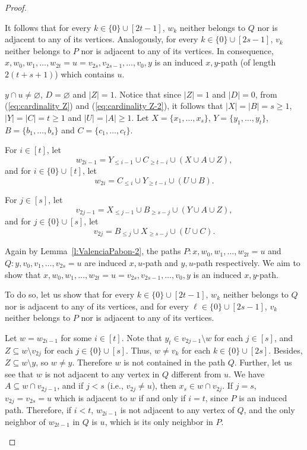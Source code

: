 \documentclass[a4paper,11pt]{article}
\renewcommand{\emptyset}{\varnothing}
\begin{document}
\begin{proof}
\begin{description}
        It follows that for every $k\in\{0\}\cup [2t-1]$, $w_k$ neither belongs to $Q$ nor is adjacent to any of its vertices. Analogously, for every $k\in\{0\}\cup [2s-1]$, $v_k$ neither belongs to $P$ nor is adjacent to any of its vertices. In consequence, $x,w_0,w_1,\ldots,w_{2t}=u=v_{2s},v_{2s-1},\ldots,v_0,y$ is an induced $x,y$-path (of length $2(t+s+1)$) which contains $u$.


        \item[Case 3.] $y\cap u\neq \emptyset$, $D=\emptyset$ and $|Z|=1$. 
        Notice that since $|Z|=1$ and $|D|=0$, from (\ref{eq:cardinality Z}) and (\ref{eq:cardinality Z-2}), it follows that $|X|=|B|=s\geq 1$, $|Y|=|C|=t\geq 1$ and $|U|=|A|\geq 1$. Let $X=\{x_1,\ldots, x_s\}$, $Y=\{y_1,\ldots,y_t\}$, $B=\{b_1,\ldots,b_s\}$ and $C=\{c_1,\ldots,c_t\}$.

        For $i \in [t]$, let
        $$w_{2i-1}=Y_{\leq i-1} \cup C_{\geq t-i} \cup (X\cup A\cup Z),$$ 
        and for $i \in \{0\}\cup[t]$, let
        $$w_{2i}=C_{\leq i} \cup Y_{\geq t-i} \cup (U\cup B).$$
        
        For $j \in [s]$, let
        $$v_{2j-1}=X_{\leq j-1} \cup B_{\geq s-j} \cup (Y\cup A\cup Z),$$ 
        and for $j \in \{0\}\cup[s]$, let
        $$v_{2j}=B_{\leq j} \cup X_{\geq s-j} \cup (U\cup C).$$

        Again by Lemma~\ref{l:ValenciaPabon-2}, the paths $P:x,w_0,w_1,\ldots,w_{2t}=u$ and $Q:y,v_0,v_1,\ldots,v_{2s}=u$ are induced $x,u$-path and $y,u$-path respectively. We aim to show that $x,w_0,w_1,\ldots,w_{2t}=u=v_{2s},v_{2s-1},\ldots,v_0,y$ is an induced $x,y$-path.

        To do so, let us show that for every $k\in\{0\}\cup [2t-1]$, $w_k$ neither belongs to $Q$ nor is adjacent to any of its vertices, and for every $\ell\in\{0\}\cup [2s-1]$, $v_k$ neither belongs to $P$ nor is adjacent to any of its vertices.

        Let $w=w_{2i-1}$ for some $i\in [t]$.
        Note that $y_{t}\in v_{2j-1}\setminus w$ for each $j\in [s]$, and $Z\subseteq w\setminus v_{2j}$ for each $j\in \{0\}\cup [s]$. Thus, $w\neq v_k$ for each $k\in \{0\}\cup [2s]$. Besides, $Z\subseteq w\setminus y$, so $w\neq y$. Therefore $w$ is not contained in the path $Q$. Further, let us see that $w$ is not adjacent to any vertex in $Q$ different from $u$. We have $A\subseteq w\cap v_{2j-1}$, and if $j<s$ (i.e., $v_{2j}\neq u$), then $x_{s}\in w\cap v_{2j}$. If $j=s$, $v_{2j}=v_{2s}=u$ which is adjacent to $w$ if and only if $i=t$, since $P$ is an induced path. Therefore, if $i<t$, $w_{2i-1}$ is not adjacent to any vertex of $Q$, and the only neighbor of $w_{2t-1}$ in $Q$ is $u$, which is its only neighbor in $P$.


\end{description}
\end{proof}
\end{document}
